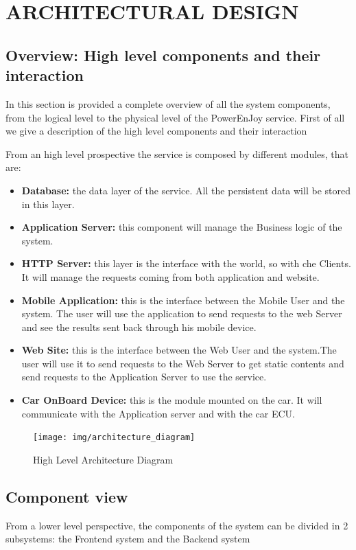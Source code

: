\section{ARCHITECTURAL DESIGN}
\subsection{Overview: High level components and their interaction} 
In this section is provided a complete overview of all the system components, from the logical level to the physical level of the PowerEnJoy service. First of all we give a description of the high level components and their interaction\newline

\noindent From an high level prospective the service is composed by different modules, that are: \newline

\begin{itemize}
\item{\textbf{Database:}} the data layer of the service. All the persistent data will be stored in this layer.
\item{\textbf{Application Server:}} this component will manage the Business logic of the system.
\item{\textbf{HTTP Server:}} this layer is the interface with the world, so with che Clients. It will manage the requests coming from both application and website.
\item{\textbf{Mobile Application:}} this is the interface between the Mobile User and the system. The user will use the application to send requests to the web Server and see the results sent back through his mobile device. 
\item{\textbf{Web Site:}} this is the interface between the Web User and the system.The user will use it to send requests to the Web Server to get static contents and send requests to the Application Server to use the service.
\item{\textbf{Car OnBoard Device:}} this is the module mounted on the car. It will communicate with the Application server and with the car ECU.
\end{itemize}

	\begin{figure}[H]	
	\centering
	\texttt{[image: img/architecture\_diagram]}
	\caption{High Level Architecture Diagram}
\end{figure}


\newpage
\subsection{Component view} 
From a lower level perspective, the components of the system can be divided in 2 subsystems: the Frontend system and the Backend system

